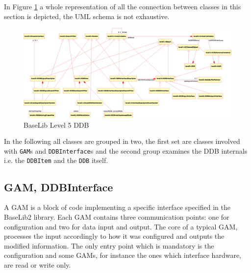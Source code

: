 In Figure \ref{f:level5:DDB} a whole representation of all the connection between classes in this section is depicted, the UML schema is not exhaustive.

\begin{figure}[h!]
 \begin{center}
  \includegraphics[width=\textwidth]{level5/level5-DDB.eps}
  \caption{BaseLib Level 5 DDB}
  \label{f:level5:DDB}
 \end{center}
\end{figure}

In the following all classes are grouped in two, the first set are classes involved with \texttt{GAM}s and \texttt{DDBInterface}s and the second group examines the DDB internals i.e. the \texttt{DDBItem} and the \texttt{DDB} itself.



\subsection{GAM, DDBInterface}
A GAM is a block of code implementing a specific interface specified in the BaseLib2 library. Each GAM contains three communication points: one for configuration and two for data input and output. The core of a typical GAM, processes the input
accordingly to how it was configured and outputs the modified information. The only entry point which is mandatory is the configuration and some GAMs, for instance the ones which interface hardware, are read or write only.

